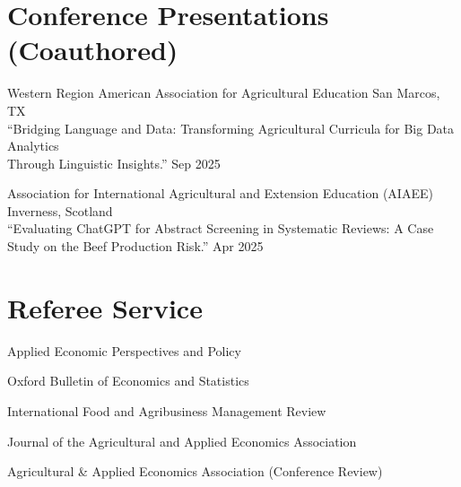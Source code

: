 \documentclass[10.5pt,letterpaper]{article}
\renewenvironment{itemize}{
	\begin{list}{}{
			\setlength{\leftmargin}{1.5em}
		}
	}{
	\end{list}
}
\begin{document}
\section*{\textbf{Conference Presentations (Coauthored)}}


\begin{itemize}
	
\item[-] Western Region American Association for Agricultural Education   \hfill San Marcos, TX \\
“Bridging Language and Data: Transforming Agricultural Curricula for Big Data Analytics \\
Through Linguistic Insights.” \hfill Sep 2025

 \item[-] Association for International Agricultural and Extension Education (AIAEE)     \hfill Inverness, Scotland \\
 “Evaluating ChatGPT for Abstract Screening in Systematic Reviews: A Case \\
 Study on the Beef Production Risk.” \hfill Apr 2025
 

	
\end{itemize}





	
	\section*{\textbf{Referee Service}}
	\begin{itemize}
		\item[-] Applied Economic Perspectives and Policy
		\item[-] Oxford Bulletin of Economics and Statistics
		\item[-] International Food and Agribusiness Management Review
		\item[-] Journal of the Agricultural and Applied Economics Association
		\item[-] Agricultural \& Applied Economics Association (Conference Review)
	\end{itemize}
	
\end{document}
